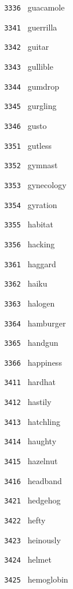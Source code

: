 \documentclass[11pt]{article}
\begin{document}
\begin{multicols}{6}
\noindent \texttt{ 3336 } guacamole  \par
\vspace{3mm}
\noindent \texttt{ 3341 } guerrilla  \par
\noindent \texttt{ 3342 } guitar  \par
\noindent \texttt{ 3343 } gullible  \par
\noindent \texttt{ 3344 } gumdrop  \par
\noindent \texttt{ 3345 } gurgling  \par
\noindent \texttt{ 3346 } gusto  \par
\vspace{3mm}
\noindent \texttt{ 3351 } gutless  \par
\noindent \texttt{ 3352 } gymnast  \par
\noindent \texttt{ 3353 } gynecology  \par
\noindent \texttt{ 3354 } gyration  \par
\noindent \texttt{ 3355 } habitat  \par
\noindent \texttt{ 3356 } hacking  \par
\vspace{3mm}
\noindent \texttt{ 3361 } haggard  \par
\noindent \texttt{ 3362 } haiku  \par
\noindent \texttt{ 3363 } halogen  \par
\noindent \texttt{ 3364 } hamburger  \par
\noindent \texttt{ 3365 } handgun  \par
\noindent \texttt{ 3366 } happiness  \par
\noindent \texttt{ 3411 } hardhat  \par
\noindent \texttt{ 3412 } hastily  \par
\noindent \texttt{ 3413 } hatchling  \par
\noindent \texttt{ 3414 } haughty  \par
\noindent \texttt{ 3415 } hazelnut  \par
\noindent \texttt{ 3416 } headband  \par
\vspace{3mm}
\noindent \texttt{ 3421 } hedgehog  \par
\noindent \texttt{ 3422 } hefty  \par
\noindent \texttt{ 3423 } heinously  \par
\noindent \texttt{ 3424 } helmet  \par
\noindent \texttt{ 3425 } hemoglobin  \par

\end{multicols}
\end{document}
